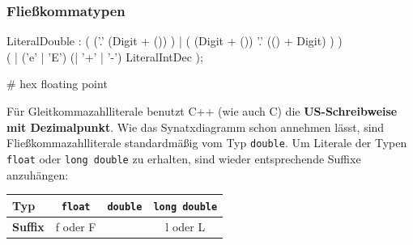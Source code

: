 \documentclass[a4paper]{report}
\begin{document}
\subsubsection{Fließkommatypen}


\begin{rail}
	LiteralDouble : (
						('.' 
							(Digit + ())
						) |
						(
							(Digit + ())
							'.' (() + Digit)
						)
					) \\
					( | 
						('e' | 'E') 
						(| '+' | '-') 
						LiteralIntDec
					);
\end{rail}

\# hex floating point

Für Gleitkommazahlliterale benutzt C++ (wie auch C) die \textbf{US-Schreibweise mit Dezimalpunkt}. Wie das Synatxdiagramm schon annehmen lässt, sind Fließkommazahlliterale standardmäßig vom Typ \texttt{double}. Um Literale der Typen \texttt{float} oder \texttt{long double} zu erhalten, sind wieder entsprechende Suffixe anzuhängen:
\begin{center}
\begin{tabular}{|l|c|c|c|} \hline
	\textbf{Typ} & \texttt{float} & \texttt{double} & \texttt{long double} \\ \hline
	\textbf{Suffix} & f oder F & & l oder L \\ \hline
\end{tabular}
\end{center}

\end{document}
